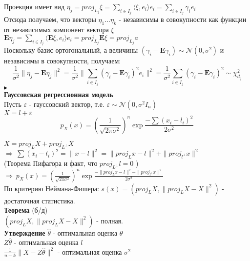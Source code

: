 \documentclass{article}
\begin{document}
Проекция имеет вид $\eta_j = proj_{L_j}\xi = \sum_{i\in I_j}\langle\xi, e_i\rangle e_i = \sum_{i\in I_j}\gamma_ie_i$\\
Отсюда получаем, что векторы $\eta_1\dots\eta_k$ - независимы в совокупности как функции от независимых компонент вектора $\xi$\\
$\mathbf{E}\eta_j = \sum_{i\in I_j}\langle\mathbf{E}\xi, e_i\rangle e_i = proj_{L_j}\mathbf{E}\xi = proj_{L_j}a$\\
Поскольку базис ортогональный, а величины $(\gamma_i - \mathbf{E}\gamma_i) \sim \mathcal{N}(0, \sigma^2)$ и независимы в совокупности, получаем: 
$$ \frac{1}{\sigma^2}\|\eta_j - \mathbf{E}\eta_j\|^2 = \frac{1}{\sigma^2}\| \sum_{i\in I_j}(\gamma_i - \mathbf{E}\gamma_i)^2e_i \|^2 =  \frac{1}{\sigma^2}\sum_{i\in I_j}(\gamma_i - \mathbf{E}\gamma_i)^2 \sim \chi^2_{d_j} $$
$\blacktriangleright$\\

\textbf{Гауссовская регрессионная модель}\\

Пусть $\varepsilon$ - гауссовский вектор, т.е. $\varepsilon \sim \mathcal{N}(0, \sigma^2I_n)$\\
$X = l + \varepsilon$\\

$$p_X(x) = \left(\frac{1}{\sqrt{2\pi \sigma^2}}\right)^n\exp{\frac{-\sum{(x_i -l_i)^2}}{2\sigma
^2}} $$	


$X = proj_LX + proj_{L^\perp}X$\\
$\Rightarrow\ \sum{(x_i-l_i)^2} = \|x - l\|^2 = \|proj_Lx - l\|^2 + \|proj_{l^\perp}x\|^2$\\
(Теорема Пифагора и факт, что $proj_{L^\perp}l = 0$ )\\
$\Rightarrow\ p_X(x) = \left(\frac{1}{\sqrt{2\pi\sigma^2}}\right)^n\exp{\frac{-\|proj_Lx - l\|^2 - \|proj_{l^\perp}x\|^2}{2\sigma^2}}$\\
По критерию Неймана-Фишера:
$s(x) = (proj_LX, \|proj_LX - X\|^2)$ - достаточная статистика.\\
\textbf{Теорема} (б/д)\\
$(proj_LX, \|proj_LX - X\|^2)$ - полная.\\

\textbf{Утверждение} $\widehat{\theta}$ - оптимальная оценка $\theta$\\
$Z\widehat{\theta}$ - оптимальная оценка $l$\\
$\frac{1}{n-k}\|X-Z\widehat{\theta}\|^2$ - оптимальная оценка $\sigma^2$\\
\end{document}
